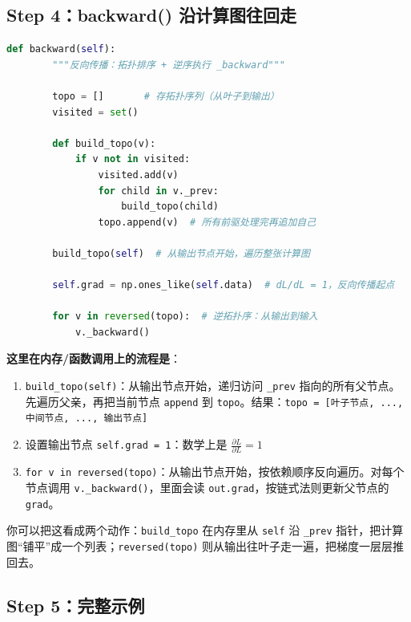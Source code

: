 \subsection{Step 4：backward() 沿计算图往回走}

\begin{lstlisting}[style=teaching, language=Python]
    def backward(self):
        """反向传播：拓扑排序 + 逆序执行 _backward"""
        
        topo = []       # 存拓扑序列（从叶子到输出）
        visited = set()

        def build_topo(v):
            if v not in visited:
                visited.add(v)
                for child in v._prev:
                    build_topo(child)
                topo.append(v)  # 所有前驱处理完再追加自己

        build_topo(self)  # 从输出节点开始，遍历整张计算图
        
        self.grad = np.ones_like(self.data)  # dL/dL = 1，反向传播起点
        
        for v in reversed(topo):  # 逆拓扑序：从输出到输入
            v._backward()
\end{lstlisting}

\textbf{这里在内存/函数调用上的流程是}：

\begin{enumerate}
    \item \texttt{build\_topo(self)}：从输出节点开始，递归访问 \texttt{\_prev} 指向的所有父节点。先遍历父亲，再把当前节点 \texttt{append} 到 \texttt{topo}。结果：\texttt{topo = [叶子节点, ..., 中间节点, ..., 输出节点]}
    
    \item 设置输出节点 \texttt{self.grad = 1}：数学上是 $\frac{\partial L}{\partial L} = 1$
    
    \item \texttt{for v in reversed(topo)}：从输出节点开始，按依赖顺序反向遍历。对每个节点调用 \texttt{v.\_backward()}，里面会读 \texttt{out.grad}，按链式法则更新父节点的 \texttt{grad}。
\end{enumerate}

你可以把这看成两个动作：\texttt{build\_topo} 在内存里从 \texttt{self} 沿 \texttt{\_prev} 指针，把计算图``铺平''成一个列表；\texttt{reversed(topo)} 则从输出往叶子走一遍，把梯度一层层推回去。

\subsection{Step 5：完整示例}


